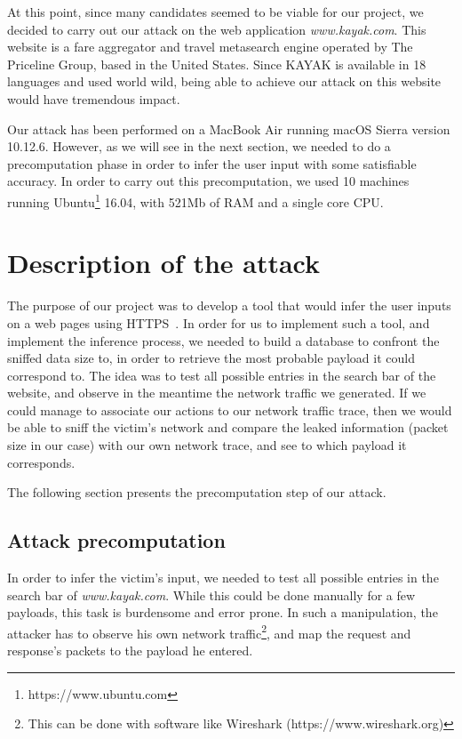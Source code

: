 \documentclass[runningheads]{llncs}
\begin{document}
\medskip

At this point, since many candidates seemed to be viable for our project, we decided to carry out our attack on the web application \emph{www.kayak.com}. This website is a fare aggregator and travel metasearch engine operated by The Priceline Group, based in the United States. Since KAYAK is available in 18 languages and used world wild, being able to achieve our attack on this website would have tremendous impact.

\medskip

Our attack has been performed on a MacBook Air running macOS Sierra version 10.12.6. However, as we will see in the next section, we needed to do a precomputation phase in order to infer the user input with some satisfiable accuracy. In order to carry out this precomputation, we used 10 machines running Ubuntu\footnote{https://www.ubuntu.com} 16.04, with 521Mb of RAM and a single core CPU.

\section{Description of the attack}

The purpose of our project was to develop a tool that would infer the user inputs on a web pages using HTTPS~. In order for us to implement such a tool, and implement the inference process, we needed to build a database to confront the sniffed data size to, in order to retrieve the most probable payload it could correspond to. The idea was to test all possible entries in the search bar of the website, and observe in the meantime the network traffic we generated. If we could manage to associate our actions to our network traffic trace, then we would be able to sniff the victim's network and compare the leaked information (packet size in our case) with our own network trace, and see to which payload it corresponds.

\medskip

The following section presents the precomputation step of our attack.

\subsection{Attack precomputation}

In order to infer the victim's input, we needed to test all possible entries in the search bar of \emph{www.kayak.com}. While this could be done manually for a few payloads, this task is burdensome and error prone. In such a manipulation, the attacker has to observe his own network traffic\footnote{This can be done with software like Wireshark (https://www.wireshark.org)}, and map the request and response's packets to the payload he entered.
\end{document}
